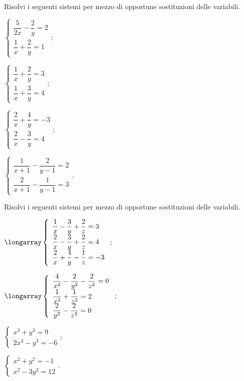 \begin{esercizio}[\Ast]
 \label{ese:19.67}
 Risolvi i seguenti sistemi per mezzo di opportune sostituzioni delle variabili.
\begin{multicols}{2}
\begin{enumeratea}
{\longarray
\item $\left\{\begin{array}{l}\dfrac{5}{2x}-\dfrac{2}{y}=2\\\dfrac{1}{x}+\dfrac{2}{y}=1\end{array}\right.;$
\item $\left\{\begin{array}{l}\dfrac{1}{x}+\dfrac{2}{y}=3\\\dfrac{1}{x}+\dfrac{3}{y}=4\end{array}\right.;$
\item $\left\{\begin{array}{l}\dfrac{2}{x}+\dfrac{4}{y}=-3\\\dfrac{2}{x}-\dfrac{3}{y}=4 \end{array}\right.;$
\item $\left\{\begin{array}{l}\dfrac{1}{x+1}-\dfrac{2}{y-1}=2\\\dfrac{2}{x+1}-\dfrac{1}{y-1}=3\end{array}\right..$}
\end{enumeratea}
\end{multicols}
\end{esercizio}

\begin{esercizio}[\Ast]
 \label{ese:19.68}
 Risolvi i seguenti sistemi per mezzo di opportune sostituzioni delle variabili.
\begin{multicols}{2}
\begin{enumeratea}
\item $\longarray\left\{\begin{array}{l}\dfrac{1}{x}-\dfrac{3}{y}+\dfrac{2}{z}=3 \\\dfrac{2}{x}-\dfrac{3}{y}+\dfrac{2}{z}=4
\\\dfrac{2}{x}+\dfrac{4}{y}-\dfrac{1}{z}=-3\end{array}\right.;$
\item $\longarray\left\{\begin{array}{l}\dfrac{4}{x^{2}}-\dfrac{2}{y^{2}}-\dfrac{2}{z^{2}}=0\\\dfrac{1}{x^{2}}+\dfrac{1}{z^{2}}=2
\\\dfrac{2}{y^{2}}-\dfrac{2}{z^{2}}=0\end{array}\right.;$
\item $\left\{\begin{array}{l}x^{3}+y^{3}=9 \\2x^{3}-y^{3}=-6 \end{array}\right.;$
\item $\left\{\begin{array}{l}x^{2}+y^{2}=-1\\x^{2}-3y^{2}=12\end{array}\right..$
\end{enumeratea}
\end{multicols}
\end{esercizio}

